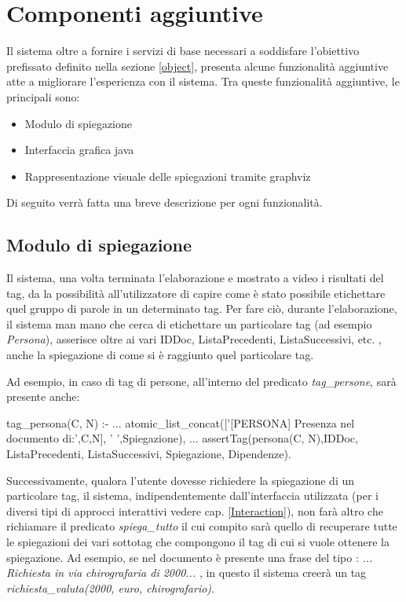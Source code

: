 
\section{Componenti aggiuntive}
Il sistema oltre a fornire i servizi di base necessari a soddisfare l'obiettivo prefissato definito nella sezione \ref{object}, presenta alcune funzionalità aggiuntive atte a migliorare l'esperienza con il sistema. Tra queste funzionalità aggiuntive, le principali sono:
\begin{itemize}
	\item Modulo di spiegazione
	\item Interfaccia grafica java
	\item Rappresentazione visuale delle spiegazioni tramite graphviz
\end{itemize}
Di seguito verrà fatta una breve descrizione per ogni funzionalità.

\subsection{Modulo di spiegazione}
\label{spiega}
Il sistema, una volta terminata l'elaborazione e mostrato a video i risultati del tag, da la possibilità all'utilizzatore di capire come è stato possibile etichettare quel gruppo di parole in un determinato tag. Per fare ciò, durante l'elaborazione, il sistema man mano che cerca di etichettare un particolare tag (ad esempio \emph{Persona}), asserisce oltre ai vari IDDoc, ListaPrecedenti, ListaSuccessivi, etc. , anche la spiegazione di come si è raggiunto quel particolare tag.

Ad esempio, in caso di tag di persone, all'interno del predicato \emph{tag\_persone}, sarà presente anche:

\begin{prologcode}
 tag_persona(C, N) :-
   ...
   atomic_list_concat(['[PERSONA] Presenza nel documento di:',C,N],
                      ' ',Spiegazione),
   ...
   assertTag(persona(C, N),IDDoc, ListaPrecedenti, ListaSuccessivi,
            Spiegazione, Dipendenze).
\end{prologcode}

Successivamente, qualora l'utente dovesse richiedere la spiegazione di un particolare tag, il sistema, indipendentemente dall'interfaccia utilizzata (per i diversi tipi di approcci interattivi vedere cap. \ref{Interaction}), non farà altro che richiamare il predicato \emph{spiega\_tutto} il cui compito sarà quello di recuperare tutte le spiegazioni dei vari sottotag che compongono il tag di cui si vuole ottenere la spiegazione.
Ad esempio, se nel documento è presente una frase del tipo : \emph{... Richiesta in via chirografaria di 2000\officialeuro ...} , in questo il sistema creerà un tag \emph{richiesta\_valuta(2000, euro, chirografario)}.


